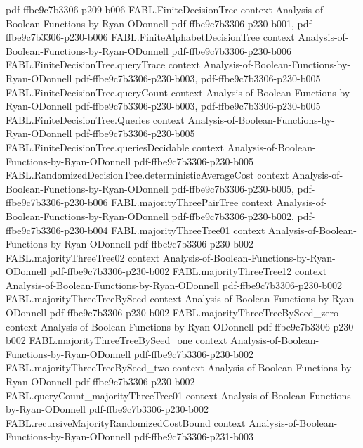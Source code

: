 \begin{theorem}
  {pdf-ffbe9c7b3306-p209-b006}
\proofstep
  {FABL.FiniteDecisionTree}
  {context}
  {Analysis-of-Boolean-Functions-by-Ryan-ODonnell}
  {pdf-ffbe9c7b3306-p230-b001,
    pdf-ffbe9c7b3306-p230-b006}
\proofstep
  {FABL.FiniteAlphabetDecisionTree}
  {context}
  {Analysis-of-Boolean-Functions-by-Ryan-ODonnell}
  {pdf-ffbe9c7b3306-p230-b006}
\proofstep
  {FABL.FiniteDecisionTree.queryTrace}
  {context}
  {Analysis-of-Boolean-Functions-by-Ryan-ODonnell}
  {pdf-ffbe9c7b3306-p230-b003,
    pdf-ffbe9c7b3306-p230-b005}
\proofstep
  {FABL.FiniteDecisionTree.queryCount}
  {context}
  {Analysis-of-Boolean-Functions-by-Ryan-ODonnell}
  {pdf-ffbe9c7b3306-p230-b003,
    pdf-ffbe9c7b3306-p230-b005}
\proofstep
  {FABL.FiniteDecisionTree.Queries}
  {context}
  {Analysis-of-Boolean-Functions-by-Ryan-ODonnell}
  {pdf-ffbe9c7b3306-p230-b005}
\proofstep
  {FABL.FiniteDecisionTree.queriesDecidable}
  {context}
  {Analysis-of-Boolean-Functions-by-Ryan-ODonnell}
  {pdf-ffbe9c7b3306-p230-b005}
\proofstep
  {FABL.RandomizedDecisionTree.deterministicAverageCost}
  {context}
  {Analysis-of-Boolean-Functions-by-Ryan-ODonnell}
  {pdf-ffbe9c7b3306-p230-b005,
    pdf-ffbe9c7b3306-p230-b006}
\proofstep
  {FABL.majorityThreePairTree}
  {context}
  {Analysis-of-Boolean-Functions-by-Ryan-ODonnell}
  {pdf-ffbe9c7b3306-p230-b002,
    pdf-ffbe9c7b3306-p230-b004}
\proofstep
  {FABL.majorityThreeTree01}
  {context}
  {Analysis-of-Boolean-Functions-by-Ryan-ODonnell}
  {pdf-ffbe9c7b3306-p230-b002}
\proofstep
  {FABL.majorityThreeTree02}
  {context}
  {Analysis-of-Boolean-Functions-by-Ryan-ODonnell}
  {pdf-ffbe9c7b3306-p230-b002}
\proofstep
  {FABL.majorityThreeTree12}
  {context}
  {Analysis-of-Boolean-Functions-by-Ryan-ODonnell}
  {pdf-ffbe9c7b3306-p230-b002}
\proofstep
  {FABL.majorityThreeTreeBySeed}
  {context}
  {Analysis-of-Boolean-Functions-by-Ryan-ODonnell}
  {pdf-ffbe9c7b3306-p230-b002}
\proofstep
  {FABL.majorityThreeTreeBySeed_zero}
  {context}
  {Analysis-of-Boolean-Functions-by-Ryan-ODonnell}
  {pdf-ffbe9c7b3306-p230-b002}
\proofstep
  {FABL.majorityThreeTreeBySeed_one}
  {context}
  {Analysis-of-Boolean-Functions-by-Ryan-ODonnell}
  {pdf-ffbe9c7b3306-p230-b002}
\proofstep
  {FABL.majorityThreeTreeBySeed_two}
  {context}
  {Analysis-of-Boolean-Functions-by-Ryan-ODonnell}
  {pdf-ffbe9c7b3306-p230-b002}
\proofstep
  {FABL.queryCount_majorityThreeTree01}
  {context}
  {Analysis-of-Boolean-Functions-by-Ryan-ODonnell}
  {pdf-ffbe9c7b3306-p230-b002}
\proofstep
  {FABL.recursiveMajorityRandomizedCostBound}
  {context}
  {Analysis-of-Boolean-Functions-by-Ryan-ODonnell}
  {pdf-ffbe9c7b3306-p231-b003}

\end{theorem}
